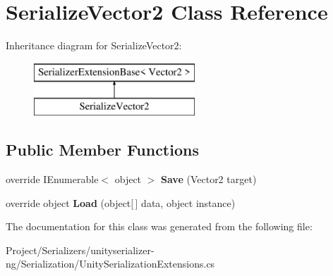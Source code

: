 \hypertarget{class_serialize_vector2}{}\section{Serialize\+Vector2 Class Reference}
\label{class_serialize_vector2}
Inheritance diagram for Serialize\+Vector2\+:\begin{figure}[H]
\begin{center}
\leavevmode
\includegraphics[height=2.000000cm]{class_serialize_vector2}
\end{center}
\end{figure}
\subsection*{Public Member Functions}
\begin{DoxyCompactItemize}
\item 
\mbox{\label{class_serialize_vector2_afda6e3e96dc0d23c05983073104156cc}} 
override I\+Enumerable$<$ object $>$ {\bfseries Save} (Vector2 target)
\item 
\mbox{\label{class_serialize_vector2_aa4853c3ec1858d811025f696d6e992c5}} 
override object {\bfseries Load} (object\mbox{[}$\,$\mbox{]} data, object instance)
\end{DoxyCompactItemize}


The documentation for this class was generated from the following file\+:\begin{DoxyCompactItemize}
\item 
Project/\+Serializers/unityserializer-\/ng/\+Serialization/Unity\+Serialization\+Extensions.\+cs\end{DoxyCompactItemize}
